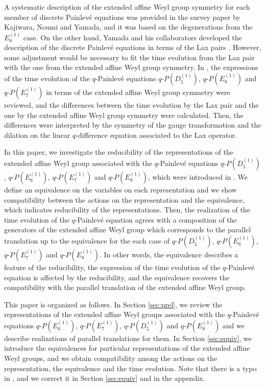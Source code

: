 \documentclass[12pt]{amsart}
\numberwithin{equation}{section}
\theoremstyle{definition}
\begin{document}
A systematic description of the extended affine Weyl group symmetry for each member of discrete Painlev\'e equations was provided in the survey paper \cite{KNY} by Kajiwara, Noumi and Yamada, and it was based on the degenerations from the $E^{(1)}_8$ case.
On the other hand, Yamada and his collaborators developed the description of the discrete Painlev\'e equations in terms of the Lax pairs \cite{Ye,Y,NTY,KNY}.
However, some adjustment would be necessary to fit the time evolution from the Lax pair with the one from the extended affine Weyl group symmetry.
In \cite{TsqP}, the expressions of the time evolution of the $q$-Painlev\'e equations $q$-$P(D^{(1)}_5)$, $q$-$P(E^{(1)}_6)$ and $q$-$P(E^{(1)}_7)$ in terms of the extended affine Weyl group symmetry were reviewed, and the differences between the time evolution by the Lax pair and the one by the extended affine Weyl group symmetry were calculated.
Then, the differences were interpreted by the symmetry of the gauge transformation and the dilation on the linear $q$-difference equation associated to the Lax operator.

In this paper, we investigate the reducibility of the representations of the extended affine Weyl group associated with the $q$-Painlev\'e equations $q$-$P(D^{(1)}_5)$, $q$-$P(E^{(1)}_6)$, $q$-$P(E^{(1)}_7)$ and $q$-$P(E^{(1)}_8)$, which were introduced in \cite{KNY}.
We define an equivalence on the variables on each representation and we show compatibility between the actions on the representation and the equivalence, which indicates reducibility of the representations.
Then, the realization of the time evolution of the $q$-Painlev\'e equation agrees with a composition of the generators of the extended affine Weyl group which corresponds to the parallel translation up to the equivalence for the each case of $q$-$P(D^{(1)}_5)$, $q$-$P(E^{(1)}_6)$, $q$-$P(E^{(1)}_7)$ and $q$-$P(E^{(1)}_8)$.
In other words, the equivalence describes a feature of the reducibility, the expression of the time evolution of the $q$-Painlev\'e equation is affected by the reducibility, and the equivalence recovers the compatibility with the parallel translation of the extended affine Weyl group.

This paper is organized as follows.
In Section \ref{sec:prel}, we review the representations of the extended affine Weyl groups associated with the $q$-Painlev\'e equations $q$-$P(E^{(1)}_6)$, $q$-$P(E^{(1)}_7)$, $q$-$P(D^{(1)}_5)$ and $q$-$P(E^{(1)}_8)$ and we describe realizations of parallel translations for them.
In Section \ref{sec:equiv}, we introduce the equivalences for particular representations of the extended affine Weyl groups, and we obtain compatibility among the actions on the representation, the equivalence and the time evolution.
Note that there is a typo in \cite[Theorem 3.1]{TsqP}, and we correct it in Section \ref{sec:equiv} and in the appendix.
\end{document}
